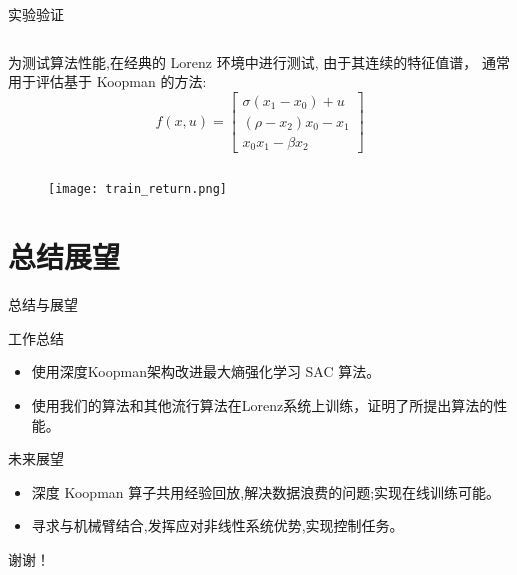 \documentclass{ldr-simple-gray}
\begin{document}
\begin{frame}{实验验证}
  \begin{columns}
    为测试算法性能,在经典的 Lorenz 环境中进行测试,
    由于其连续的特征值谱，
    通常用于评估基于 Koopman 的方法:
    \begin{equation*}
      f(x, u)=\left[\begin{array}{c}
      \sigma\left(x_{1}-x_{0}\right)+u \\
      \left(\rho-x_{2}\right) x_{0}-x_{1} \\
      x_{0} x_{1}-\beta x_{2}
      \end{array}\right]
    \end{equation*}
  \end{columns}

\begin{figure}
  \texttt{[image: train\_return.png]}
\end{figure}

\end{frame}

\section{总结展望}

\begin{frame}{总结与展望}
  \begin{center}
    \Large
    工作总结
    \normalsize
  \end{center}
  \begin{itemize}
    \item 使用深度Koopman架构改进最大熵强化学习 SAC 算法。
    \item 使用我们的算法和其他流行算法在Lorenz系统上训练，证明了所提出算法的性能。
  \end{itemize}  

  \begin{center}
    \Large
    未来展望
    \normalsize
  \end{center}
  \begin{itemize}
    \item 深度 Koopman 算子共用经验回放,解决数据浪费的问题;实现在线训练可能。
    \item 寻求与机械臂结合,发挥应对非线性系统优势,实现控制任务。
  \end{itemize}
\end{frame}
\note{}

\begin{frame}{\quad}
\begin{center}
    谢\quad 谢！
\end{center}

\end{frame}
\end{document}
